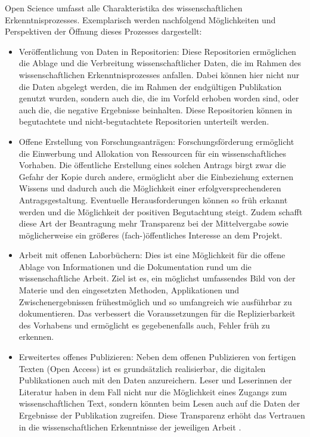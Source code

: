 Open Science umfasst alle Charakteristika des wissenschaftlichen Erkenntnisprozesses. Exemplarisch werden nachfolgend Möglichkeiten und Perspektiven der Öffnung dieses Prozesses dargestellt:
\begin{itemize}
\item Veröffentlichung von Daten in Repositorien: Diese Repositorien ermöglichen die Ablage und die Verbreitung wissenschaftlicher Daten, die im Rahmen des wissenschaftlichen Erkenntnisprozesses anfallen. Dabei können hier nicht nur die Daten abgelegt werden, die im Rahmen der endgültigen Publikation genutzt wurden, sondern auch die, die im Vorfeld erhoben worden sind, oder auch die, die negative Ergebnisse beinhalten. Diese Repositorien können in begutachtete und nicht-begutachtete Repositorien unterteilt werden.
\item Offene Erstellung von Forschungsanträgen: Forschungsförderung ermöglicht die Einwerbung und Allokation von Ressourcen für ein wissenschaftliches Vorhaben. Die öffentliche Erstellung eines solchen Antrags birgt zwar die Gefahr der Kopie durch andere, ermöglicht aber die Einbeziehung externen Wissens und dadurch auch die Möglichkeit einer erfolgversprechenderen Antragsgestaltung. Eventuelle Herausforderungen können so früh erkannt werden und die Möglichkeit der positiven Begutachtung steigt. Zudem schafft diese Art der Beantragung mehr Transparenz bei der Mittelvergabe sowie möglicherweise ein größeres (fach-)öffentliches Interesse an dem Projekt.
\item Arbeit mit offenen Laborbüchern: Dies ist eine Möglichkeit für die offene Ablage von Informationen und die Dokumentation rund um die wissenschaftliche Arbeit. Ziel ist es, ein möglichst umfassendes Bild von der Materie und den eingesetzten Methoden, Applikationen und Zwischenergebnissen frühestmöglich und so umfangreich wie ausführbar zu dokumentieren. Das verbessert die Voraussetzungen für die Replizierbarkeit des Vorhabens und ermöglicht es gegebenenfalls auch, Fehler früh zu erkennen.
\item	Erweitertes offenes Publizieren: Neben dem offenen Publizieren von fertigen Texten (Open Access) ist es grundsätzlich realisierbar, die digitalen Publikationen auch mit den Daten anzureichern. Leser und Leserinnen der Literatur haben in dem Fall nicht nur die Möglichkeit eines Zugangs zum wissenschaftlichen Text, sondern könnten beim Lesen auch auf die Daten der Ergebnisse der Publikation zugreifen. Diese Transparenz erhöht das Vertrauen in die wissenschaftlichen Erkenntnisse der jeweiligen Arbeit \cite{Nosek_2015}.

\end{itemize}
